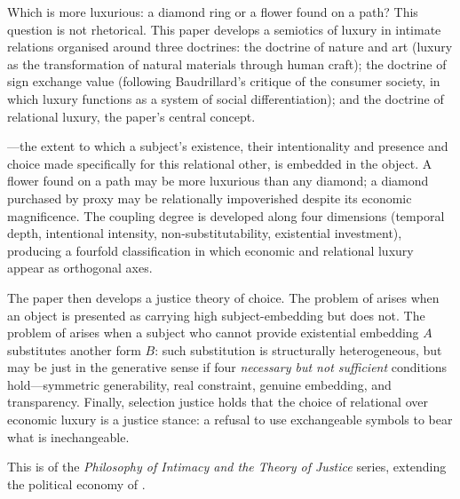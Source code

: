 Which is more luxurious: a diamond ring or a flower found on a path? This question is not rhetorical. This paper develops a semiotics of luxury in intimate relations organised around three doctrines: the doctrine of nature and art (luxury as the transformation of natural materials through human craft); the doctrine of sign exchange value (following Baudrillard's critique of the consumer society, in which luxury functions as a system of social differentiation); and the doctrine of relational luxury, the paper's central concept.

---the extent to which a subject's existence, their intentionality and presence and choice made specifically for this relational other, is embedded in the object. A flower found on a path may be more luxurious than any diamond; a diamond purchased by proxy may be relationally impoverished despite its economic magnificence. The coupling degree is developed along four dimensions (temporal depth, intentional intensity, non-substitutability, existential investment), producing a fourfold classification in which economic and relational luxury appear as orthogonal axes.

The paper then develops a justice theory of choice. The problem of  arises when an object is presented as carrying high subject-embedding but does not. The problem of  arises when a subject who cannot provide existential embedding $A$ substitutes another form $B$: such substitution is structurally heterogeneous, but may be just in the generative sense if four \emph{necessary but not sufficient} conditions hold---symmetric generability, real constraint, genuine embedding, and transparency. Finally, selection justice holds that the choice of relational over economic luxury is a justice stance: a refusal to use exchangeable symbols to bear what is inechangeable.

This is  of the \emph{Philosophy of Intimacy and the Theory of Justice} series, extending the political economy of  \parencite{paperxv}.
